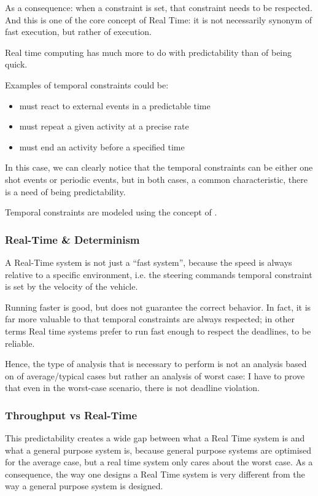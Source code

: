 As a consequence: when a constraint is set, that constraint needs to be respected. And this is one of the core concept of Real Time:
it is not necessarily synonym of fast execution, but rather of  execution.

Real time computing has much more to do with predictability than of being quick.

Examples of temporal constraints could be:
\begin{itemize}
\item must react to external events in a predictable time
\item must repeat a given activity at a precise rate
\item must end an activity before a specified time
\end{itemize}
In this case, we can clearly notice that the temporal constraints can be either one shot events or periodic events, but in both cases, a common characteristic, there is a need of being predictability.

Temporal constraints are modeled using the concept of .

\subsubsection{Real-Time \& Determinism}
A Real-Time system is not just a ``fast system'', because the speed is always relative to a specific environment, i.e. the steering commands temporal constraint is set by the velocity of the vehicle.

Running faster is good, but does not guarantee the correct behavior. In fact, it is far more valuable to that temporal constraints are always respected; in other terms Real time systems prefer to run fast enough to respect the deadlines, to be reliable.

Hence, the type of analysis that is necessary to perform is not an analysis based on of average/typical cases but rather an analysis of worst case: I have to prove that even in the worst-case scenario, there is not deadline violation.

\subsubsection{Throughput vs Real-Time}
This predictability creates a wide gap between what a Real Time system is and what a general purpose system is, because general purpose systems are optimised for the average case, but a real time system only cares about the worst case. As a consequence, the way one designs a Real Time system is very different from the way a general purpose system is designed.

